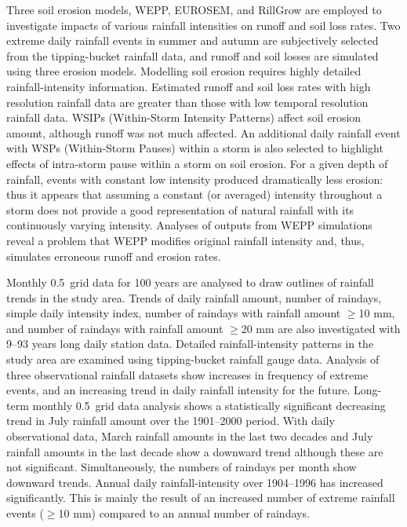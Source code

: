 \begin{abstractseparate}
Three soil erosion models, WEPP, EUROSEM, and RillGrow are employed to
investigate impacts of various rainfall intensities on runoff and soil loss
rates. Two extreme daily rainfall events in summer and autumn are subjectively
selected from the tipping-bucket rainfall data, and runoff and soil losses are
simulated using three erosion models. Modelling soil erosion requires highly
detailed rainfall-intensity information. Estimated runoff and soil loss rates
with high resolution rainfall data are greater than those with low temporal
resolution rainfall data. WSIPs (Within-Storm Intensity Patterns) affect soil
erosion amount, although runoff was not much affected. An additional daily
rainfall event with WSPs (Within-Storm Pauses) within a storm is also selected
to highlight effects of intra-storm pause within a storm on soil erosion. 
For a given depth of rainfall, events with constant low intensity produced
dramatically less erosion: thus it appears that assuming a constant (or
averaged) intensity throughout a storm does not provide a good representation of
natural rainfall with its continuously varying intensity.
Analyses of outputs from WEPP simulations reveal a problem that WEPP modifies
original rainfall intensity and, thus, simulates erroneous runoff and erosion
rates.

Monthly 0.5\textdegree\ grid data for 100 years are analysed to draw outlines of
rainfall trends in the study area. Trends of daily rainfall amount, number of
raindays, simple daily intensity index, number of raindays with rainfall amount
$\geq$10 mm, and number of raindays with rainfall amount $\geq$20 mm are also
investigated with 9--93 years long daily station data. Detailed
rainfall-intensity patterns in the study area are examined using tipping-bucket
rainfall gauge data. Analysis of three observational rainfall datasets show
increases in frequency of extreme events, and an increasing trend in daily
rainfall intensity for the future.
Long-term monthly 0.5\textdegree\ grid data analysis shows a statistically
significant decreasing trend in July rainfall amount over the 1901--2000 period.
With daily observational data, March rainfall amounts in the last two decades
and July rainfall amounts in the last decade show a downward trend although
these are not significant.  Simultaneously, the numbers of raindays per month
show downward trends. Annual daily rainfall-intensity over 1904--1996 has
increased significantly. This is mainly the result of an increased number of
extreme rainfall events ($\geq$10 mm) compared to an annual number of raindays.


\end{abstractseparate}
